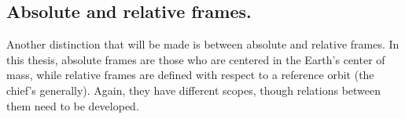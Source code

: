 	\subsection{Absolute and relative frames.}
	\indent Another distinction that will be made is between absolute and relative frames. In this thesis, absolute frames are those who are centered in the Earth's center of mass, while relative frames are defined with respect to a reference orbit (the chief's generally). Again, they have different scopes, though relations between them need to be developed.
% 
